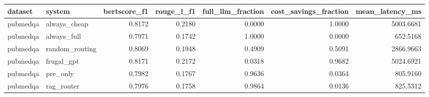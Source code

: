 \begin{tabular}{llrrrrr}
\toprule
dataset & system & bertscore_f1 & rouge_l_f1 & full_llm_fraction & cost_savings_fraction & mean_latency_ms \\
\midrule
pubmedqa & always_cheap & 0.8172 & 0.2180 & 0.0000 & 1.0000 & 5003.6681 \\
pubmedqa & always_full & 0.7971 & 0.1742 & 1.0000 & 0.0000 & 652.5168 \\
pubmedqa & random_routing & 0.8069 & 0.1948 & 0.4909 & 0.5091 & 2866.9663 \\
pubmedqa & frugal_gpt & 0.8171 & 0.2172 & 0.0318 & 0.9682 & 5024.6921 \\
pubmedqa & pre_only & 0.7982 & 0.1767 & 0.9636 & 0.0364 & 805.9160 \\
pubmedqa & rag_router & 0.7976 & 0.1758 & 0.9864 & 0.0136 & 825.5312 \\
\bottomrule
\end{tabular}
